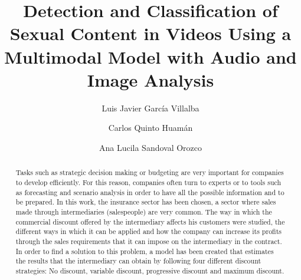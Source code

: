 \documentclass[review]{elsarticle}
\begin{document}
\begin{frontmatter}

\title{Detection and Classification of Sexual Content in Videos Using a Multimodal Model with Audio and Image Analysis }


\author[dir]{Luis Javier Garc\'ia Villalba}
\author[dir]{Carlos Quinto Huamán}
\author[dir]{Ana Lucila Sandoval Orozco}
\address[dir]{Group of Analysis, Security and Systems (GASS)\\
		Department of Software Engineering and Artificial Intelligence (DISIA)\\
		Faculty of Computer Science and Engineering, Office 431\\
		Universidad Complutense de Madrid (UCM)\\
		Calle Profesor Jos\'e Garc\'ia Santesmases 9, Ciudad Universitaria, 28040 Madrid, Spain}


\begin{abstract}

Tasks such as strategic decision making or budgeting are very important for companies to develop efficiently. For this reason, companies often turn to experts or to tools such as forecasting and scenario analysis in order to have all the possible information and to be prepared.
In this work, the insurance sector has been chosen, a sector where sales made through intermediaries (salespeople) are very common. The way in which the commercial discount offered by the intermediary affects his customers were studied, the different ways in which it can be applied and how the company can increase its profits through the sales requirements that it can impose on the intermediary in the contract.
In order to find a solution to this problem, a model has been created that estimates the results that the intermediary can obtain by following four different discount strategies: No discount, variable discount, progressive discount and maximum discount.



\end{abstract}
\end{frontmatter}
\end{document}
